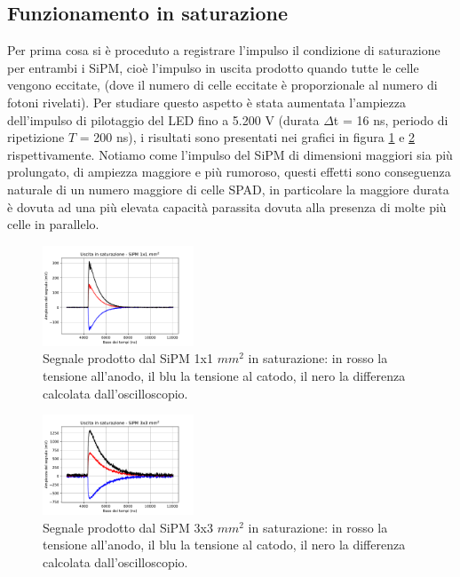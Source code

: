 \documentclass[journal]{IEEEtran}
\begin{document}
\subsection{\textbf{Funzionamento in saturazione}}
Per prima cosa si è proceduto a registrare l'impulso il condizione di saturazione per entrambi i SiPM, cioè l'impulso in uscita prodotto quando tutte le celle vengono eccitate, (dove il numero di celle eccitate è proporzionale al numero di fotoni rivelati). Per studiare questo aspetto è stata aumentata l'ampiezza dell'impulso di pilotaggio del LED fino a 5.200 V (durata $\Delta$t = 16 ns, periodo di ripetizione $T$ = 200 ns), i risultati sono presentati nei grafici in figura \ref{fig:SiPM_sat_1mm} e \ref{fig:SiPM_sat_3mm} rispettivamente. Notiamo come l'impulso del SiPM di dimensioni maggiori sia più prolungato, di ampiezza maggiore e più rumoroso, questi effetti sono conseguenza naturale di un numero maggiore di celle SPAD, in particolare la maggiore durata è dovuta ad una più elevata capacità parassita dovuta alla presenza di molte più celle in parallelo.


\begin{figure}[H]%
\begin{center}
\includegraphics[width=0.40\textwidth]{analysis/output/SiPM_sat_1mm.pdf}
\caption{Segnale prodotto dal SiPM 1x1 $mm^2$ in saturazione: in rosso la tensione all'anodo, il blu la tensione al catodo, il nero la differenza calcolata dall'oscilloscopio.}
\label{fig:SiPM_sat_1mm}
\end{center}
\end{figure}

\begin{figure}[H]%
\begin{center}
\includegraphics[width=0.40\textwidth]{analysis/output/SiPM_sat_3mm.pdf}
\caption{Segnale prodotto dal SiPM 3x3 $mm^2$ in saturazione: in rosso la tensione all'anodo, il blu la tensione al catodo, il nero la differenza calcolata dall'oscilloscopio.}
\label{fig:SiPM_sat_3mm}
\end{center}
\end{figure}
\end{document}

